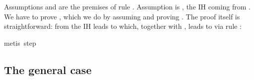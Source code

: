 \begin{isabellebody}
\begin{isamarkuptxt}
Assumptions  and \mbox{}
are the premises of rule .
Assumption  is \mbox{},
the IH coming from . We have to prove ,
which we do by assuming  and proving .
The proof itself is straightforward: from \mbox{} the IH
leads to  which, together with ,
leads to \mbox{} via rule :%
\end{isamarkuptxt}%
\isamarkuptrue%
\isamarkupfalse%
{}metis\ step{}\isanewline
{}\isamarkupfalse%
%
\endisatagproof
{\isafoldproof}%
%
\isadelimproof
%
\endisadelimproof
%
\begin{isamarkuptext}%
\subsection{The general case}


\end{isamarkuptext}
\end{isabellebody}
